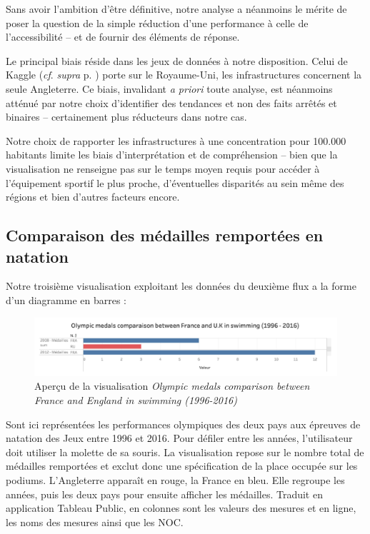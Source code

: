 \documentclass[hidelinks, 12pt]{report}
\begin{document}
Sans avoir l'ambition d'être définitive, notre analyse a néanmoins le mérite de poser la question de la simple réduction d'une performance à celle de l'accessibilité -- et de fournir des éléments de réponse.

Le principal biais réside dans les jeux de données à notre disposition. Celui de Kaggle (\textit{cf}. \textit{supra} p. \pageref{kaggle}) porte sur le Royaume-Uni, les infrastructures concernent la seule Angleterre. Ce biais, invalidant \textit{a priori} toute analyse, est néanmoins atténué par notre choix d'identifier des tendances et non des faits arrêtés et binaires -- certainement plus réducteurs dans notre cas.

Notre choix de rapporter les infrastructures à une concentration pour 100.000 habitants limite les biais d'interprétation et de compréhension -- bien que la visualisation ne renseigne pas sur le temps moyen requis pour accéder à l'équipement sportif le plus proche, d'éventuelles disparités au sein même des régions et bien d'autres facteurs encore.

\subsection{Comparaison des médailles remportées en natation}

Notre troisième visualisation exploitant les données du deuxième flux a la forme d'un diagramme en barres :

\begin{center}
	\begin{figure}[H]
		\centering
		\setlength{\belowcaptionskip}{-35pt}
		\includegraphics[scale=0.4]{images/datavis-swim-fr-eng-medals.png}
		\captionsetup{justification=centering}
		\caption{Aperçu de la visualisation \textit{Olympic medals comparison between France and England in swimming (1996-2016)}}
	\end{figure}
\end{center}

Sont ici représentées les performances olympiques des deux pays aux épreuves de natation des Jeux entre 1996 et 2016. Pour défiler entre les années, l'utilisateur doit utiliser la molette de sa souris. La visualisation repose sur le nombre total de médailles remportées et exclut donc une spécification de la place occupée sur les podiums. L'Angleterre apparaît en rouge, la France en bleu. Elle regroupe les années, puis les deux pays pour ensuite afficher les médailles. Traduit en application Tableau Public, en colonnes sont les valeurs des mesures et en ligne, les noms des mesures ainsi que les NOC.
\end{document}
